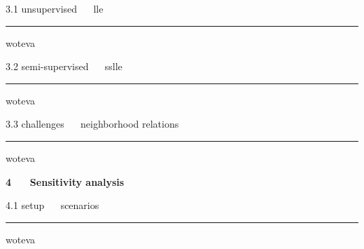 \documentclass[11pt,compress,t,notes=noshow, xcolor=table]{beamer}
\newcommand{\highlight}[1]{\textcolor{highlightcol}{\textbf{#1}}}
\begin{document}
\LARGE
\begin{frame}{\textcolor{gray!90}{3.1 unsupervised} ~~ lle}
\normalsize
\vspace{-0.5cm}
\noindent \textcolor{gray!90}{\rule{\textwidth}{1pt}}


\medskip

woteva

\end{frame}


\LARGE
\begin{frame}{\textcolor{gray!90}{3.2 semi-supervised} ~~ sslle}
\normalsize
\vspace{-0.5cm}
\noindent \textcolor{gray!90}{\rule{\textwidth}{1pt}}


\medskip

woteva

\end{frame}


\LARGE
\begin{frame}{\textcolor{gray!90}{3.3 challenges} ~~ neighborhood relations}
\normalsize
\vspace{-0.5cm}
\noindent \textcolor{gray!90}{\rule{\textwidth}{1pt}}


\medskip

woteva

\end{frame}


\begin{frame}{}

\LARGE
\hspace{0pt}
\vfill
\textbf{\highlight{4 ~~ Sensitivity analysis}}
\vfill
\hspace{0pt}

\end{frame}


\LARGE
\begin{frame}{\textcolor{gray!90}{4.1 setup} ~~ scenarios}
\normalsize
\vspace{-0.5cm}
\noindent \textcolor{gray!90}{\rule{\textwidth}{1pt}}


\medskip

woteva

\end{frame}
\end{document}
